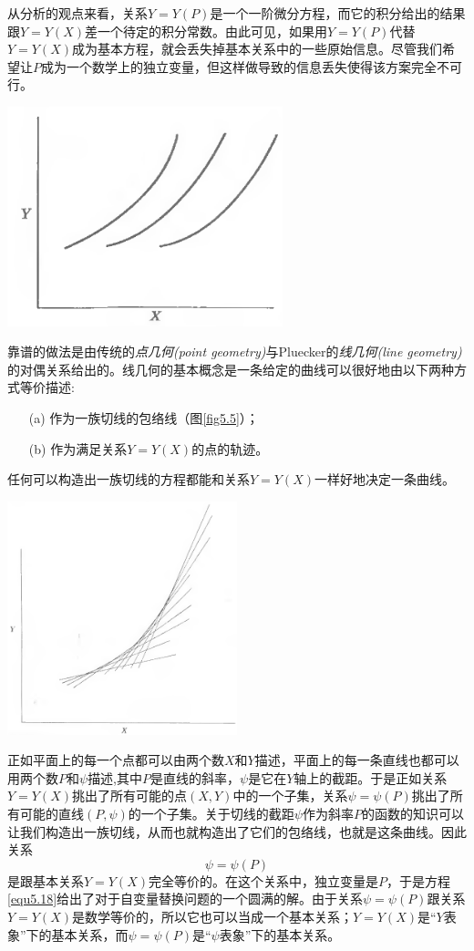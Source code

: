 从分析的观点来看，关系$Y=Y(P)$是一个一阶微分方程，而它的积分给出的结果跟$Y=Y(X)$差一个待定的积分常数。由此可见，如果用$Y=Y(P)$代替$Y=Y(X)$成为基本方程，就会丢失掉基本关系中的一些原始信息。尽管我们希望让$P$成为一个数学上的独立变量，但这样做导致的信息丢失使得该方案完全不可行。

{
	\centering
	\includegraphics[width=0.6\textwidth]{Pictures/fig5.4.png}
	\figcaption{}
	\label{fig5.4}
}

靠谱的做法是由传统的{\it 点几何(point geometry)}与Pluecker的{\it 线几何(line geometry)}的对偶关系给出的。线几何的基本概念是一条给定的曲线可以很好地由以下两种方式等价描述:

\begin{itemize}
\item[(a)] 作为一族切线的包络线（图\ref{fig5.5}）；
\item[(b)] 作为满足关系$Y=Y(X)$的点的轨迹。
\end{itemize}

任何可以构造出一族切线的方程都能和关系$Y=Y(X)$一样好地决定一条曲线。

{
	\centering
	\includegraphics[width=0.5\textwidth]{Pictures/fig5.5.png}
	\figcaption{}
	\label{fig5.5}
}

正如平面上的每一个点都可以由两个数$X$和$Y$描述，平面上的每一条直线也都可以用两个数$P$和$\psi$描述,其中$P$是直线的斜率，$\psi$是它在$Y$轴上的截距。于是正如关系$Y=Y(X)$挑出了所有可能的点$(X,Y)$中的一个子集，关系$\psi=\psi(P)$挑出了所有可能的直线$(P,\psi)$的一个子集。关于切线的截距$\psi$作为斜率$P$的函数的知识可以让我们构造出一族切线，从而也就构造出了它们的包络线，也就是这条曲线。因此关系
\begin{equation}
\label{equ5.18}
	\psi=\psi(P)
\end{equation}
是跟基本关系$Y=Y(X)$完全等价的。在这个关系中，独立变量是$P$，于是方程\eqref{equ5.18}给出了对于自变量替换问题的一个圆满的解。由于关系$\psi=\psi(P)$跟关系$Y=Y(X)$是数学等价的，所以它也可以当成一个基本关系；$Y=Y(X)$是“$Y$表象”下的基本关系，而$\psi=\psi(P)$是“$\psi$表象”下的基本关系。

